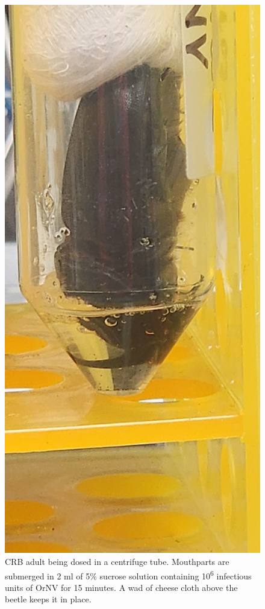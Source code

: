 \documentclass[12pt,letterpaper,english,bibliography=totocnumbered, abstract=on]{scrartcl}
\begin{document}
\begin{figure}[H]
	\centering
	\includegraphics[width=0.5\linewidth]{images/crb-in-tube}
	\caption{CRB adult being dosed in a centrifuge tube. Mouthparts are submerged in 2 ml of 5\% sucrose solution containing 10\textsuperscript{6} infectious units of OrNV for 15 minutes. A wad of cheese cloth above the beetle keeps it in place.}
	\label{fig:crb-in-tube}
\end{figure}
\end{document}
